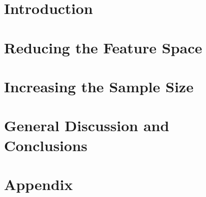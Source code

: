 \documentclass[11pt,paper=B5,twoside,openright,titlepage,
               headinclude,,footinclude,BCOR5mm,
               numbers=noenddot,cleardoublepage=empty,
               tablecaptionabove]{scrreprt}
\begin{document}
\pagestyle{plain}



\cleardoublepage
\cleardoublepage


\cleardoublepage
%
\pagestyle{scrheadings} 
\cleardoublepage

\cleardoublepage
{}

\cleardoublepage
\part{Introduction}




\cleardoublepage
\part{Reducing the Feature Space}\label{part:feature}




\cleardoublepage
\part{Increasing the Sample Size}\label{part:increase}



\cleardoublepage
\part{General Discussion and Conclusions}\label{part:dicussion}


\appendix
\part{Appendix}


\cleardoublepage
\end{document}
